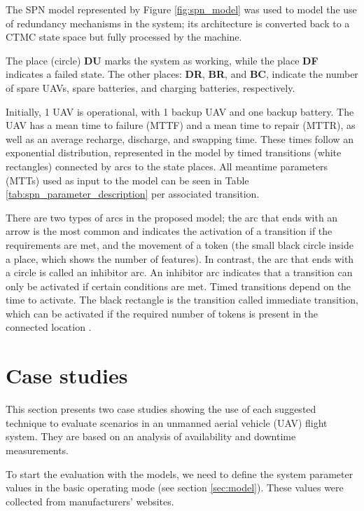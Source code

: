 \documentclass[conference]{IEEEtran}
\begin{document}
The SPN model represented by Figure \ref{fig:spn_model} was used to model the use of redundancy mechanisms in the system; its architecture is converted back to a CTMC state space but fully processed by the machine.

The place (circle) \textbf{DU} marks the system as working, while the place \textbf{DF} indicates a failed state. The other places: \textbf{DR}, \textbf{BR}, and \textbf{BC}, indicate the number of spare UAVs, spare batteries, and charging batteries, respectively.

Initially, 1 UAV is operational, with 1 backup UAV and one backup battery. The UAV has a mean time to failure (MTTF) and a mean time to repair (MTTR), as well as an average recharge, discharge, and swapping time. These times follow an exponential distribution, represented in the model by timed transitions (white rectangles) connected by arcs to the state places. All meantime parameters (MTTs) used as input to the model can be seen in Table \ref{tab:spn_parameter_description} per associated transition.

There are two types of arcs in the proposed model; the arc that ends with an arrow is the most common and indicates the activation of a transition if the requirements are met, and the movement of a token (the small black circle inside a place, which shows the number of features). In contrast, the arc that ends with a circle is called an inhibitor arc. An inhibitor arc indicates that a transition can only be activated if certain conditions are met. Timed transitions depend on the time to activate. The black rectangle is the transition called immediate transition, which can be activated if the required number of tokens is present in the connected location \citep{melo2021distributed}.



\section{Case studies}\label{sec:case_studies}
This section presents two case studies showing the use of each suggested technique to evaluate scenarios in an unmanned aerial vehicle (UAV) flight system. They are based on an analysis of availability and downtime measurements.

To start the evaluation with the models, we need to define the system parameter values in the basic operating mode (see section \ref{sec:model}). These values were collected from manufacturers' websites.
\end{document}
